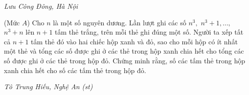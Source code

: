 \begin{multicols}{2}
\begin{figure}[H]
		\vspace*{-10pt}
	\end{figure}
	\begin{flushright}
		\textit{\small Lưu Công Đông, Hà Nội}
	\end{flushright}
	{\color{thachthuctoanhoc}{\usefont{T5}{qag}{b}{n} P700.}}
	(Mức $A$) Cho $n$ là một số nguyên dương. Lần lượt ghi các số $n^3,$ $n^3+1,\ldots,$ $n^3+n$ lên $n+1$ tấm thẻ trắng, trên mỗi thẻ ghi đúng một số. Người ta xếp tất cả $n+1$ tấm thẻ đó vào hai chiếc hộp xanh và đỏ, sao cho mỗi hộp có ít nhất một thẻ và  tổng các số được ghi ở các thẻ trong hộp xanh chia hết cho tổng các số được ghi ở các thẻ trong hộp đỏ. Chứng minh rằng, số các tấm thẻ trong hộp xanh chia hết cho số các tấm thẻ trong hộp đỏ.
	\begin{flushright}
		\textit{\small Tô Trung Hiếu, Nghệ An (st)}
	\end{flushright}
\end{multicols}
